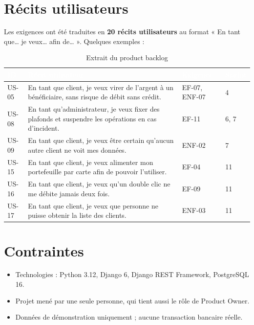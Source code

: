 \documentclass[11pt,a4paper]{report}
\newcommand{\entete}{\rowcolor{primaire}}
\newcommand{\tete}[1]{\textcolor{white}{\textbf{#1}}}
\begin{document}
\section{Récits utilisateurs}

Les exigences ont été traduites en \textbf{20 récits utilisateurs} au format
« En tant que\dots{} je veux\dots{} afin de\dots{} ». Quelques exemples :

\begin{table}[H]
\centering
\caption{Extrait du product backlog}
\begin{tabularx}{\linewidth}{@{}p{1.2cm}Yp{2.2cm}C{1.2cm}@{}}
\toprule
\entete \tete{ID} & \tete{Récit utilisateur} & \tete{Exigence} & \tete{Sprint} \\
\midrule
US-05 & En tant que client, je veux virer de l'argent à un bénéficiaire, sans risque de débit sans crédit. & EF-07, ENF-07 & 4 \\
US-08 & En tant qu'administrateur, je veux fixer des plafonds et suspendre les opérations en cas d'incident. & EF-11 & 6, 7 \\
US-09 & En tant que client, je veux être certain qu'aucun autre client ne voit mes données. & ENF-02 & 7 \\
US-15 & En tant que client, je veux alimenter mon portefeuille par carte afin de pouvoir l'utiliser. & EF-04 & 11 \\
US-16 & En tant que client, je veux qu'un double clic ne me débite jamais deux fois. & EF-09 & 11 \\
US-17 & En tant que client, je veux que personne ne puisse obtenir la liste des clients. & ENF-03 & 11 \\
\bottomrule
\end{tabularx}
\end{table}

\section{Contraintes}

\begin{itemize}
  \item Technologies : Python 3.12, Django 6, Django REST Framework, PostgreSQL 16.
  \item Projet mené par une seule personne, qui tient aussi le rôle de Product Owner.
  \item Données de démonstration uniquement ; aucune transaction bancaire réelle.
\end{itemize}
\end{document}
